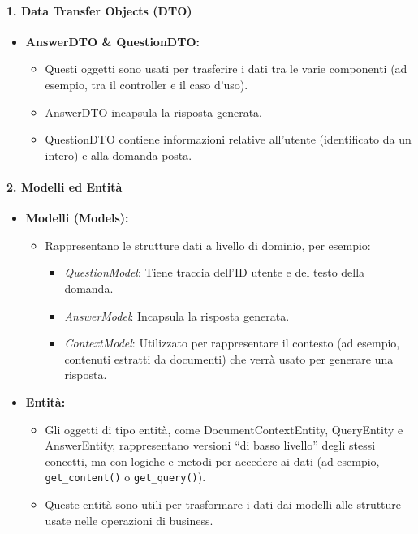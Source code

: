 \paragraph{1. Data Transfer Objects (DTO)}
\begin{itemize}
    \item \textbf{AnswerDTO \& QuestionDTO:}
    \begin{itemize}
        \item Questi oggetti sono usati per trasferire i dati tra le varie componenti (ad esempio, tra il controller e il caso d’uso).
        \item AnswerDTO incapsula la risposta generata.
        \item QuestionDTO contiene informazioni relative all’utente (identificato da un intero) e alla domanda posta.
    \end{itemize}
\end{itemize}

\paragraph{2. Modelli ed Entità}
\begin{itemize}
    \item \textbf{Modelli (Models):}
    \begin{itemize}
        \item Rappresentano le strutture dati a livello di dominio, per esempio:
        \begin{itemize}
            \item \textit{QuestionModel}: Tiene traccia dell’ID utente e del testo della domanda.
            \item \textit{AnswerModel}: Incapsula la risposta generata.
            \item \textit{ContextModel}: Utilizzato per rappresentare il contesto (ad esempio, contenuti estratti da documenti) che verrà usato per generare una risposta.
        \end{itemize}
    \end{itemize}
    \item \textbf{Entità:}
    \begin{itemize}
        \item Gli oggetti di tipo entità, come DocumentContextEntity, QueryEntity e AnswerEntity, rappresentano versioni “di basso livello” degli stessi concetti, ma con logiche e metodi per accedere ai dati (ad esempio, \texttt{get\_content()} o \texttt{get\_query()}).
        \item Queste entità sono utili per trasformare i dati dai modelli alle strutture usate nelle operazioni di business.
    \end{itemize}
\end{itemize}

